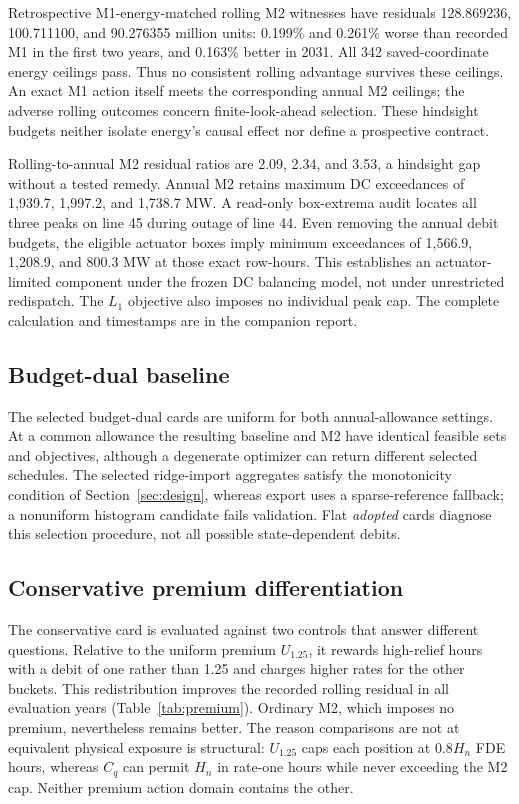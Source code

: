 \documentclass[10pt,journal]{IEEEtran}
\newcounter{procedure}
\begin{document}
Retrospective M1-energy-matched rolling M2 witnesses have residuals 128.869236, 100.711100, and 90.276355 million units: 0.199\% and 0.261\% worse than recorded M1 in the first two years, and 0.163\% better in 2031. All 342 saved-coordinate energy ceilings pass. Thus no consistent rolling advantage survives these ceilings. An exact M1 action itself meets the corresponding annual M2 ceilings; the adverse rolling outcomes concern finite-look-ahead selection. These hindsight budgets neither isolate energy's causal effect nor define a prospective contract.

Rolling-to-annual M2 residual ratios are 2.09, 2.34, and 3.53, a hindsight gap without a tested remedy. Annual M2 retains maximum DC exceedances of 1,939.7, 1,997.2, and 1,738.7 MW. A read-only box-extrema audit locates all three peaks on line 45 during outage of line 44. Even removing the annual debit budgets, the eligible actuator boxes imply minimum exceedances of 1,566.9, 1,208.9, and 800.3 MW at those exact row-hours. This establishes an actuator-limited component under the frozen DC balancing model, not under unrestricted redispatch. The $L_1$ objective also imposes no individual peak cap. The complete calculation and timestamps are in the companion report.

\subsection{Budget-dual baseline}
The selected budget-dual cards are uniform for both annual-allowance settings. At a common allowance the resulting baseline and M2 have identical feasible sets and objectives, although a degenerate optimizer can return different selected schedules. The selected ridge-import aggregates satisfy the monotonicity condition of Section~\ref{sec:design}, whereas export uses a sparse-reference fallback; a nonuniform histogram candidate fails validation. Flat \emph{adopted} cards diagnose this selection procedure, not all possible state-dependent debits.


\subsection{Conservative premium differentiation}
The conservative card is evaluated against two controls that answer different questions. Relative to the uniform premium $U_{1.25}$, it rewards high-relief hours with a debit of one rather than 1.25 and charges higher rates for the other buckets. This redistribution improves the recorded rolling residual in all evaluation years (Table~\ref{tab:premium}). Ordinary M2, which imposes no premium, nevertheless remains better. The reason comparisons are not at equivalent physical exposure is structural: $U_{1.25}$ caps each position at $0.8H_n$ FDE hours, whereas $C_q$ can permit $H_n$ in rate-one hours while never exceeding the M2 cap. Neither premium action domain contains the other.
\end{document}

